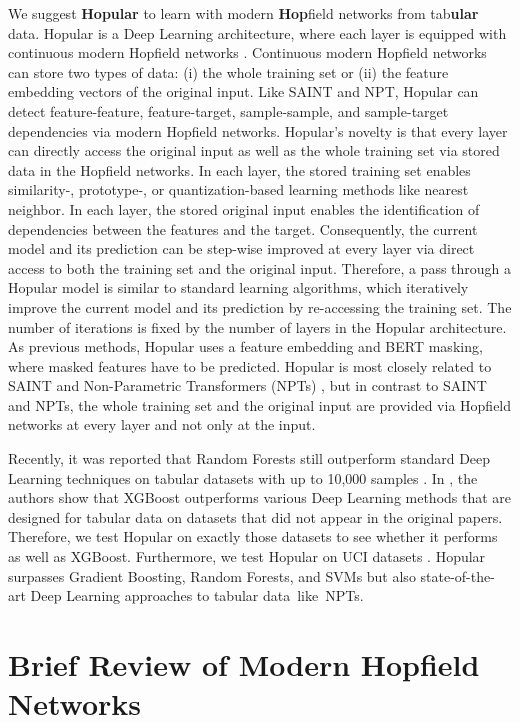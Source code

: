 \documentclass{article}
\theoremstyle{plain}
\theoremstyle{definition}
\theoremstyle{remark}
\begin{document}
We suggest \textbf{Hopular} to learn with modern \textbf{Hop}field networks from tab\textbf{ular} data.
Hopular is a Deep Learning architecture, where each layer is
equipped with continuous modern Hopfield networks
\citep{Ramsauer:21,Widrich:20nips}.
Continuous modern Hopfield networks can store two types of data:
(i) the whole training set or
(ii) the feature embedding vectors of the original input.
Like SAINT and NPT, Hopular can detect feature-feature, feature-target, 
sample-sample, and sample-target dependencies via modern Hopfield networks.
Hopular's novelty is that every layer can directly access 
the original input as well as the whole training set 
via stored data in the Hopfield networks. 
In each layer, the stored training set enables
similarity-, prototype-, or quantization-based learning methods like
nearest neighbor.
In each layer, the stored original input enables
the identification of dependencies between the features and the target.
Consequently, the current model and its prediction 
can be step-wise improved at every
layer via direct access to both the training set and the original input.
Therefore, a pass through a Hopular model is similar to standard
learning algorithms, which iteratively improve the current model and its prediction
by re-accessing the training set. The number of iterations
is fixed by the number of layers in the Hopular architecture.
As previous methods, Hopular uses a feature embedding and
BERT masking, where masked features have to be predicted.
Hopular is most closely related to SAINT \citep{Somepalli:21}
and Non-Parametric Transformers (NPTs) \citep{Kossen:21},
but in contrast to SAINT and NPTs, the whole training set and the original input
are provided via Hopfield networks at every layer and
not only at the input.

Recently, it was reported that Random Forests 
still outperform standard Deep Learning techniques on tabular datasets with up to 10,000
samples \citep{Xu:21}.
In \citep{ShwartzZiv:21}, the authors show that XGBoost
outperforms various Deep Learning methods that are designed for tabular data on
datasets that did not appear in the original papers.
Therefore, we test Hopular on exactly those datasets to see whether
it performs as well as XGBoost.
Furthermore, we test Hopular on
UCI datasets \citep{Ramsauer:21,Klambauer:17,Wainberg:16,Fernandez:14}. 
Hopular surpasses Gradient Boosting, Random Forests,
and SVMs but also state-of-the-art Deep Learning approaches
to tabular data~like~NPTs.

\section{Brief Review of Modern Hopfield Networks}\label{sec:MHN}
\end{document}
